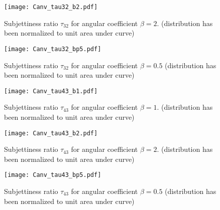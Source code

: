 \begin{figure}[H]
    \begin{center}
        \texttt{[image: Canv\_tau32\_b2.pdf]}
        \caption{Subjettiness ratio $\tau_{32}$ for angular coefficient $\beta=2.$ (distribution has been normalized to unit area under curve)}
    \end{center}
\end{figure}
\begin{figure}[H]
    \begin{center}
        \texttt{[image: Canv\_tau32\_bp5.pdf]}
        \caption{Subjettiness ratio $\tau_{32}$ for angular coefficient $\beta=0.5$ (distribution has been normalized to unit area under curve)}
    \end{center}
\end{figure}
\begin{figure}[H]
    \begin{center}    
        \texttt{[image: Canv\_tau43\_b1.pdf]}
        \caption{Subjettiness ratio $\tau_{43}$ for angular coefficient $\beta=1.$ (distribution has been normalized to unit area under curve)}
    \end{center}
\end{figure}
\begin{figure}[H]
    \begin{center}
        \texttt{[image: Canv\_tau43\_b2.pdf]}
        \caption{Subjettiness ratio $\tau_{43}$ for angular coefficient $\beta=2.$ (distribution has been normalized to unit area under curve)}
    \end{center}
\end{figure}
\begin{figure}[H]
    \begin{center}
        \texttt{[image: Canv\_tau43\_bp5.pdf]}
        \caption{Subjettiness ratio $\tau_{43}$ for angular coefficient $\beta=0.5$ (distribution has been normalized to unit area under curve)}
    \end{center}
\end{figure}